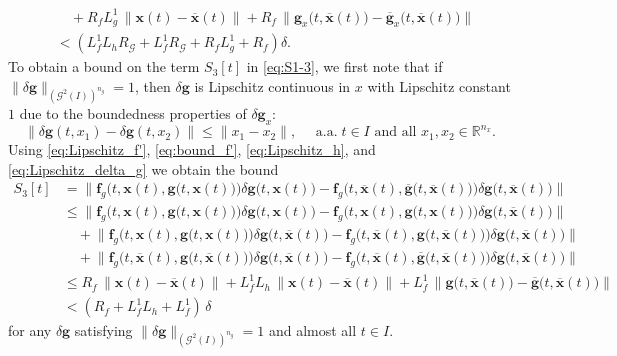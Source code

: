 \documentclass[onefignum,onetabnum]{siamart220329}
\numberwithin{equation}{section}
\newcommand{\aall}{\mbox{ a.a.} \;}
\newcommand {\real} {\mathbb{R}}
\newcommand{\bff}{\ensuremath{\mathbf{f}}} %
\newcommand{\bg}{\ensuremath{\mathbf{g}}} %
\newcommand{\bx}{\ensuremath{\mathbf{x}}} %
\newcommand {\cG} {\mathcal{G}}
\begin{document}
\begin{appendix}
\begin{equation}
\begin{aligned}
	&\quad + R_f  L_g^1 \, \| \bx(t) - \overline{\bx}(t) \| + R_f \, \big\| \bg_x\big(t, \overline{\bx}(t) \big) - \overline{\bg}_x\big( t, \overline{\bx}(t) \big) \big\| \\
     	&< (L_f^1  L_h  R_\cG + L_f^1  R_\cG + R_f  L_g^1 + R_f) \delta. \label{eq:S_2[t]_bound}
     \end{aligned}
     \end{equation} 
      To obtain a bound on the term $S_3[t]$ in \cref{eq:S1-3}, we first note that if $\| \delta \bg \|_{(\cG^2(I))^{n_g} } = 1$, then $\delta \bg$ is Lipschitz continuous in $x$ with Lipschitz constant $1$ due to the boundedness properties of $\delta \bg_x$:
     \begin{equation} \label{eq:Lipschitz_delta_g}
     	\| \delta \bg(t, x_1) - \delta \bg(t, x_2) \| \leq \| x_1 - x_2 \|, \quad \aall t \in I  \mbox{ and all }  x_1, x_2 \in \real^{n_x}.
  \end{equation}
    Using \cref{eq:Lipschitz_f'}, \cref{eq:bound_f'}, \cref{eq:Lipschitz_h}, and \cref{eq:Lipschitz_delta_g} we obtain the bound
     \begin{equation}
     \begin{aligned}
     	S_3[t] &= \Big\| \bff_g \Big(t, \bx(t), \bg \big(t, \bx(t) \big) \Big) \delta \bg \big(t, \bx(t) \big) - \bff_g \Big(t, \overline{\bx}(t), \overline{\bg} \big(t, \overline{\bx}(t) \big) \Big) \delta \bg \big(t, \overline{\bx}(t) \big) \Big\| \\
     	&\leq \Big\| \bff_g \Big(t, \bx(t), \bg \big(t, \bx(t) \big) \Big) \delta \bg \big(t, \bx(t) \big) - \bff_g \Big(t, \bx(t), \bg \big(t, \bx(t) \big) \Big) \delta \bg \big(t, \overline{\bx}(t) \big) \Big\| \\
     	&\quad + \Big\| \bff_g \Big(t, \bx(t), \bg \big(t, \bx(t) \big) \Big) \delta \bg \big(t, \overline{\bx}(t) \big) - \bff_g \Big(t, \overline{\bx}(t), \bg \big(t, \overline{\bx}(t) \big) \Big) \delta \bg \big(t, \overline{\bx}(t) \big) \Big\| \\
     	&\quad + \Big\| \bff_g \Big(t, \overline{\bx}(t), \bg \big(t, \overline{\bx}(t) \big) \Big) \delta \bg \big(t, \overline{\bx}(t) \big) - \bff_g \Big(t, \overline{\bx}(t), \overline{\bg} \big(t, \overline{\bx}(t) \big) \Big) \delta \bg \big(t, \overline{\bx}(t) \big)  \Big\| \\
     	&\leq R_f \, \| \bx(t) - \overline{\bx}(t) \| + L_f^1  L_h \, \| \bx(t) - \overline{\bx}(t) \| + L_f^1 \, \big\| \bg\big(t,  \overline{\bx}(t) \big) - \overline{\bg}\big(t,  \overline{\bx}(t) \big) \big\| \\
     	&< (R_f + L_f^1  L_h + L_f^1) \, \delta \label{eq:S_3[t]_bound}
     \end{aligned}
     \end{equation}
     for any $\delta \bg$ satisfying $\| \delta \bg \|_{(\cG^2(I))^{n_g} } = 1$ and almost all $t \in I$.
     

\end{appendix}
\end{document}
